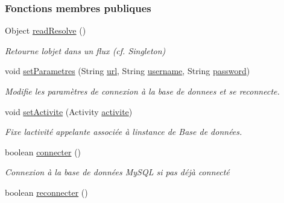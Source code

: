 \subsubsection*{Fonctions membres publiques}
\begin{DoxyCompactItemize}
\item 
Object \hyperlink{classfr_1_1campus_1_1laurainc_1_1honeybee_1_1_base_de_donnees_a356a61d32b2d1fdac4e35c04f969fa00}{read\+Resolve} ()
\begin{DoxyCompactList}\small\item\em Retourne l\textquotesingle{}objet dans un flux (cf. Singleton) \end{DoxyCompactList}\item 
void \hyperlink{classfr_1_1campus_1_1laurainc_1_1honeybee_1_1_base_de_donnees_a0960cb9d71647e80e195a580f90cd0d6}{set\+Parametres} (String \hyperlink{classfr_1_1campus_1_1laurainc_1_1honeybee_1_1_base_de_donnees_ad1d04b4da375002e91d8370b9d19918e}{url}, String \hyperlink{classfr_1_1campus_1_1laurainc_1_1honeybee_1_1_base_de_donnees_a7d1662e10f11f740155774b625ed1a87}{username}, String \hyperlink{classfr_1_1campus_1_1laurainc_1_1honeybee_1_1_base_de_donnees_af1bb604a666a7eee9edd93b6cafaf064}{password})
\begin{DoxyCompactList}\small\item\em Modifie les paramètres de connexion à la base de donnees et se reconnecte. \end{DoxyCompactList}\item 
void \hyperlink{classfr_1_1campus_1_1laurainc_1_1honeybee_1_1_base_de_donnees_a4d5b875376c84e702c60bb54cee58c3f}{set\+Activite} (Activity \hyperlink{classfr_1_1campus_1_1laurainc_1_1honeybee_1_1_base_de_donnees_aad4fd29f29916bc4277fa16262d19431}{activite})
\begin{DoxyCompactList}\small\item\em Fixe l\textquotesingle{}activité appelante associée à l\textquotesingle{}instance de Base de données. \end{DoxyCompactList}\item 
boolean \hyperlink{classfr_1_1campus_1_1laurainc_1_1honeybee_1_1_base_de_donnees_a08564ea7dccde161d6eac4b8879401bb}{connecter} ()
\begin{DoxyCompactList}\small\item\em Connexion à la base de données My\+S\+QL si pas déjà connecté \end{DoxyCompactList}\item 
boolean \hyperlink{classfr_1_1campus_1_1laurainc_1_1honeybee_1_1_base_de_donnees_a89357a1cc8a3648400df37a8bfe95958}{reconnecter} ()

\end{DoxyCompactItemize}

